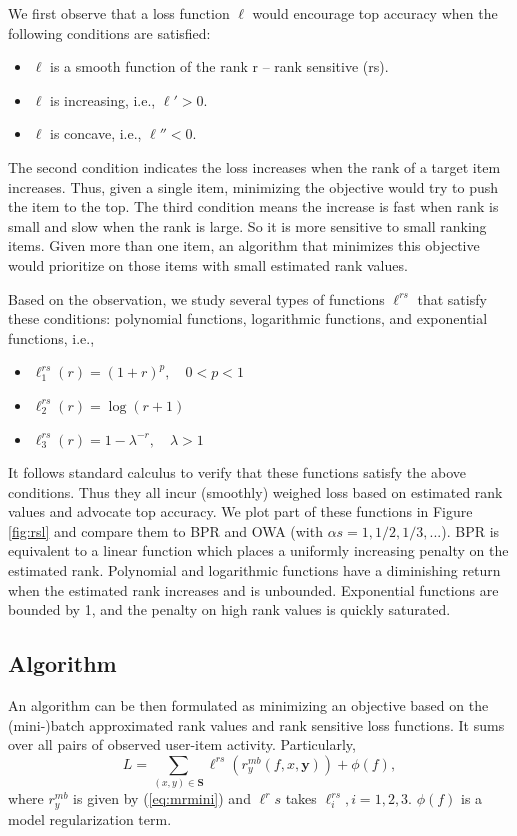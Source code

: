 \documentclass[letterpaper]{article}
\begin{document}
We first observe that a loss function $\ell$ would encourage top accuracy when the following conditions are satisfied:
\begin{itemize}
\item $\ell$ is a smooth function of the rank r -- rank sensitive (rs).
\item $\ell$ is increasing, i.e., $\ell' > 0$.
\item $\ell$ is concave, i.e., $\ell'' < 0$.
\end{itemize}

The second condition indicates the loss increases when the rank of a target item increases. Thus, given a single item, minimizing the objective would try to push the item to the top. The third condition means the increase is fast when rank is small and slow when the rank is large. So it is more sensitive to small ranking items. Given more than one item, an algorithm that minimizes this objective would prioritize on those items with small estimated rank values.

Based on the observation, we study several types of functions $\ell^{rs}$ that satisfy these conditions: polynomial functions, logarithmic functions, and exponential functions, i.e.,
\begin{itemize}
\item $\ell_1^{rs}(r) = (1+r)^p, \quad 0<p<1$
\item $\ell_2^{rs}(r) = \log(r+1)$
\item $\ell_3^{rs}(r) = 1 - \lambda^{-r}, \quad \lambda > 1$
\end{itemize}

It follows standard calculus to verify that these functions satisfy the above conditions. Thus they all incur (smoothly) weighed loss based on estimated rank values and advocate top accuracy. We plot part of these functions in Figure \ref{fig:rsl} and compare them to BPR and OWA (with ${\alpha}s=1, 1/2, 1/3, ...$). BPR is equivalent to a linear function which places a uniformly increasing penalty on the estimated rank. Polynomial and logarithmic functions have a diminishing return when the estimated rank increases and is unbounded. Exponential functions are bounded by 1, and the penalty on high rank values is quickly saturated.%

\subsection{Algorithm}
An algorithm can be then formulated as minimizing an objective based on the (mini-)batch approximated rank values and rank sensitive loss functions. It sums over all pairs of observed user-item activity. Particularly,
\begin{equation}
\label{eq:alg}
L = \sum_{(x,y)\in \textbf{S}} \ell^{rs}(r^{mb}_y(f,x,\textbf{y})) + \phi(f),
\end{equation}
where $r_y^{mb}$ is given by (\ref{eq:mrmini}) and $\ell^rs$ takes $\ell^{rs}_i, i=1,2,3$. $\phi(f)$ is a model regularization term.
\end{document}

